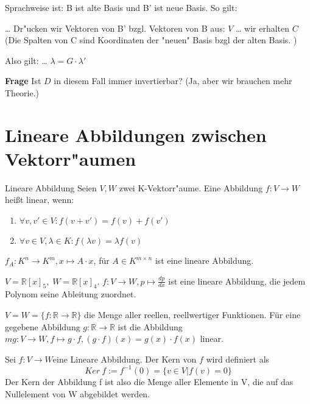 \documentclass[oneside,fontsize=11pt,paper=a4,BCOR=0mm,DIV=12,automark,headsepline]{scrbook}
\theoremstyle{remark}
\theoremstyle{definition}
\theoremstyle{definition}
\theoremstyle{remark}
\begin{document}
Sprachweise ist: B ist alte Basis und B' ist neue Basis.
So gilt:
\begin{relation}
\ldots{} Dr"ucken wir Vektoren von B' bzgl. Vektoren von B aus: \(V\) \ldots{}
wir erhalten \(C\) 
(Die Spalten von C sind Koordinaten der "neuen" Basis bzgl der alten Basis. )

Also gilt: \ldots{}
\(\lambda = G\cdot \lambda'\)
\end{relation}

\textbf{Frage} Ist \(D\) in diesem Fall immer invertierbar? (Ja, aber wir brauchen mehr Theorie.)

\chapter{Lineare Abbildungen zwischen Vektorr"aumen}
\label{sec:orgb4c03c4}
\begin{definition}{Lineare Abbildung}{}
Seien \(V, W\) zwei K-Vektorr"aume. Eine Abbildung \(f: V\rightarrow W\) heißt linear, wenn:

\begin{enumerate}
	\item \(\forall v,v' \in V: f(v+v')=f(v)+f(v')\)
	\item \(\forall v\in V, \lambda \in K: f(\lambda v)=\lambda f(v)\)
\end{enumerate}

\end{definition}

\begin{exa}
$f_{A}: K^n\rightarrow K^m, x\mapsto A\cdot x$, für $A \in K^{m\times n}$ ist eine lineare Abbildung.
\end{exa}

\begin{exa}
\(V=\mathbb{R}[x]_5,\;W=\mathbb{R}[x]_4\). $f: V\rightarrow W, p \mapsto \frac{dp}{dx}$ ist eine lineare Abbildung, die jedem Polynom seine Ableitung zuordnet.
\end{exa}

\begin{exa}
$V=W=\{f:\mathbb{R}\rightarrow\mathbb{R}\}$ die Menge aller reellen, reellwertiger Funktionen. Für eine gegebene Abbildung $g:\mathbb{R}\rightarrow\mathbb{R}$ ist die Abbildung $mg: V\rightarrow W, f\mapsto g\cdot f, (g\cdot f)(x)=g(x)\cdot f(x)$ linear.
\end{exa}

\begin{definition}{}{}
Sei $f:V\rightarrow W$eine Lineare Abbildung. Der Kern von \(f\) wird definiert als \[Ker\: f := f^{-1}(0) = \{v\in V|f(v)=0\}\] Der Kern der Abbildung f ist also die Menge aller Elemente in V, die auf das Nullelement von W abgebildet werden.
\end{definition}
\end{document}

